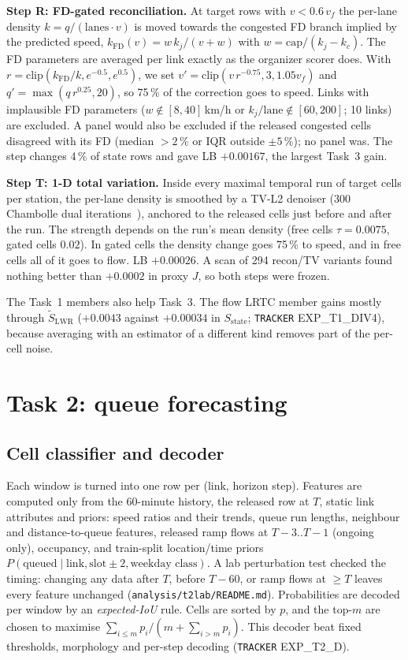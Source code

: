\documentclass[conference,10pt]{IEEEtran}
\newcommand{\file}[1]{\texttt{\small #1}}
\begin{document}
\textbf{Step R: FD-gated reconciliation.} At target rows with $v<0.6\,v_f$ the per-lane density $k=q/(\text{lanes}\cdot v)$ is moved
towards the congested FD branch implied by the predicted speed, $k_\text{FD}(v)=w\,k_j/(v+w)$ with $w=\text{cap}/(k_j-k_c)$.
The FD parameters are averaged per link exactly as the organizer scorer does. With $r=\text{clip}(k_\text{FD}/k,e^{-0.5},e^{0.5})$, we set
$v'=\text{clip}(v\,r^{-0.75},3,1.05v_f)$ and $q'=\max(q\,r^{0.25},20)$, so 75\,\% of the correction goes to speed. Links with implausible FD
parameters ($w\notin[8,40]$\,km/h or $k_j/\text{lane}\notin[60,200]$; 10 links) are excluded. A panel would also be excluded if the
released congested cells disagreed with its FD (median $>2\,\%$ or IQR outside $\pm5\,\%$); no panel was. The step
changes 4\,\% of state rows and gave LB $+0.00167$, the largest Task~3 gain.

\textbf{Step T: 1-D total variation.} Inside every maximal temporal run of target cells per station, the per-lane density is
smoothed by a TV-L2 denoiser (300 Chambolle dual iterations~\cite{chambolle2004}), anchored to the released cells
just before and after the run. The strength depends on the run's mean density (free cells $\tau=0.0075$, gated cells $0.02$). In gated cells the
density change goes 75\,\% to speed, and in free cells all of it goes to flow. LB $+0.00026$. A scan of 294 recon/TV variants found nothing
better than $+0.0002$ in proxy $J$, so both steps were frozen.

The Task~1 members also help Task~3. The flow LRTC member gains mostly through $\widetilde S_\text{LWR}$ ($+0.0043$ against $+0.00034$ in
$S_\text{state}$; \file{TRACKER} EXP\_T1\_DIV4), because averaging with an estimator of a different kind removes
part of the per-cell noise.

\section{Task 2: queue forecasting}\label{sec:t2}
\subsection{Cell classifier and decoder}
Each window is turned into one row per (link, horizon step). Features are computed only from the 60-minute history, the
released row at $T$, static link attributes and priors: speed ratios and their trends, queue run lengths, neighbour and distance-to-queue
features, released ramp flows at $T{-}3..T{-}1$ (ongoing only), occupancy, and train-split location/time priors
$P(\text{queued}\mid\text{link},\text{slot}\pm2,\text{weekday class})$. A lab perturbation test checked the timing: changing any data after $T$,
before $T{-}60$, or ramp flows at $\ge T$ leaves every feature unchanged (\file{analysis/t2lab/README.md}). Probabilities are decoded per
window by an \emph{expected-IoU} rule. Cells are sorted by $p$, and the top-$m$ are chosen to maximise
$\sum_{i\le m}p_i/(m+\sum_{i>m}p_i)$. This decoder beat fixed thresholds, morphology and per-step decoding (\file{TRACKER} EXP\_T2\_D).
\end{document}

